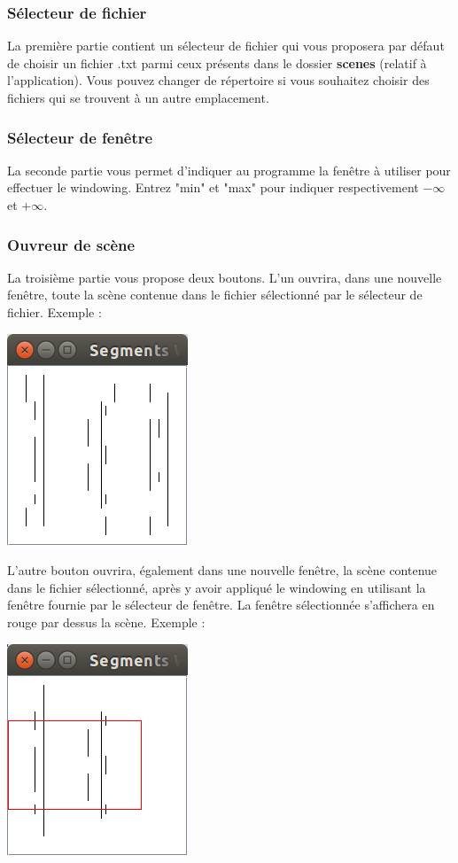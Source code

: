 \documentclass[10pt,a4paper]{article}
\begin{document}
\subsubsection{Sélecteur de fichier}
La première partie contient un sélecteur de fichier qui vous proposera par défaut de choisir un fichier .txt parmi ceux présents dans le dossier \textbf{scenes} (relatif à l'application). Vous pouvez changer de répertoire si vous souhaitez choisir des fichiers qui se trouvent à un autre emplacement.

\subsubsection{Sélecteur de fenêtre}
La seconde partie vous permet d'indiquer au programme la fenêtre à utiliser pour effectuer le windowing. Entrez "min" et "max" pour indiquer respectivement $-\infty$ et $+\infty$.

\subsubsection{Ouvreur de scène}
La troisième partie vous propose deux boutons. L'un ouvrira, dans une nouvelle fenêtre, toute la scène contenue dans le fichier sélectionné par le sélecteur de fichier. Exemple :

\centerline{\includegraphics[scale=0.5]{images/ui_whole_scene.png}}

L'autre bouton ouvrira, également dans une nouvelle fenêtre, la scène contenue dans le fichier sélectionné, après y avoir appliqué le windowing en utilisant la fenêtre fournie par le sélecteur de fenêtre. La fenêtre sélectionnée s'affichera en rouge par dessus la scène. Exemple :

\centerline{\includegraphics[scale=0.5]{images/ui_restricted_window.png}}
\end{document}
